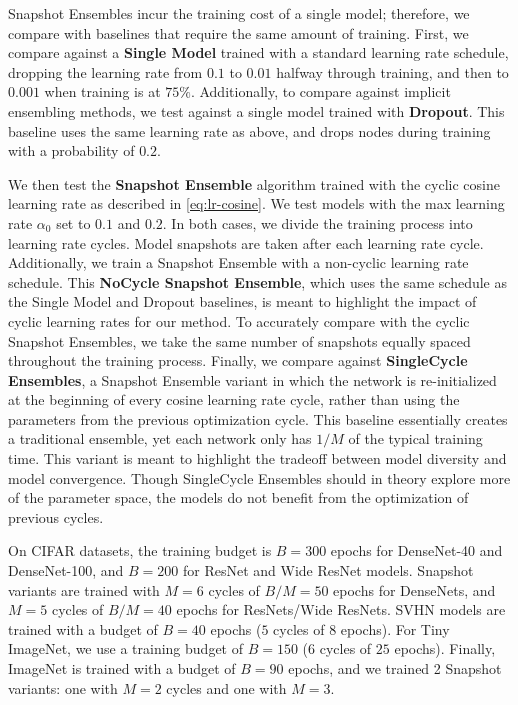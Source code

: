  Snapshot Ensembles incur the training cost of a single model; therefore, we compare with baselines that require the same amount of training. First, we compare against a {\bf Single Model} trained with a standard learning rate schedule, dropping the learning rate from $0.1$ to $0.01$ halfway through training, and then to $0.001$ when training is at $75\%$.
Additionally, to compare against implicit ensembling methods, we test against a single model trained with {\bf Dropout}. This baseline uses the same learning rate as above, and drops nodes during training with a probability of $0.2$.

We then test the {\bf Snapshot Ensemble} algorithm trained with the cyclic cosine learning rate as described in \eqref{eq:lr-cosine}. We test models with the max learning rate $\alpha_0$ set to $0.1$ and $0.2$.
In both cases, we divide the training process into learning rate cycles. Model snapshots are taken after each learning rate cycle.
Additionally, we train a Snapshot Ensemble with a non-cyclic learning rate schedule. This {\bf NoCycle Snapshot Ensemble}, which uses the same schedule as the Single Model and Dropout baselines, is meant to highlight the impact of cyclic learning rates for our method.
To accurately compare with the cyclic Snapshot Ensembles, we take the same number of snapshots equally spaced throughout the training process.
Finally, we compare against {\bf SingleCycle Ensembles}, a Snapshot Ensemble variant in which the network is re-initialized at the beginning of every cosine learning rate cycle, rather than using the parameters from the previous optimization cycle.
This baseline essentially creates a traditional ensemble, yet each network only has $1/M$ of the typical training time.
This variant is meant to highlight the tradeoff between model diversity and model convergence. Though SingleCycle Ensembles should in theory explore more of the parameter space, the models do not benefit from the optimization of previous cycles.

 On CIFAR datasets, the training budget is $B=300$ epochs for DenseNet-40 and DenseNet-100, and $B=200$ for ResNet and Wide ResNet models. Snapshot variants are trained with $M=6$ cycles of $B/M=50$ epochs for DenseNets, and $M=5$ cycles of $B/M=40$ epochs for ResNets/Wide ResNets.
SVHN models are trained with a budget of $B=40$ epochs ($5$ cycles of $8$ epochs). For Tiny ImageNet, we use a training budget of $B=150$ ($6$ cycles of $25$ epochs). Finally, ImageNet is trained with a budget of $B=90$ epochs, and we trained 2 Snapshot variants: one with $M=2$ cycles and one with $M=3$.

